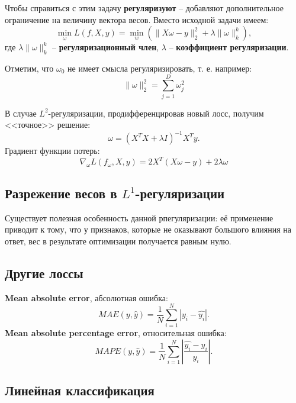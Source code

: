 \documentclass[a4paper, 10pt, openany]{book} %
\begin{document}
	Чтобы справиться с этим задачу \textbf{регуляризуют} -- добавляют дополнительное ограничение на величину вектора весов. Вместо исходной задачи имеем:
	\begin{equation*}
		\min_\omega L(f,X,y) = \min_w (\|X\omega-y\|^2_2 + \lambda \|\omega\|^k_k),
	\end{equation*}
	где $\lambda \|\omega\|^k_k$ -- \textbf{регуляризационный член}, $\lambda$ -- \textbf{коэффициент регуляризации}.
	
	Отметим, что $\omega_0$ не имеет смысла регуляризировать, т. е. например:
	\begin{equation*}
		\|\omega\|^2_2 = \sum_{j=1}^{D} \omega_j^2
	\end{equation*}
	
	В случае $L^2$-регуляризации, продифференцировав новый лосс, получим <<точное>> решение:
	\begin{equation*}
		\omega = (X^TX + \lambda I)^{-1}X^Ty.
	\end{equation*}
	Градиент функции потерь:
	\begin{equation*}
		\nabla_\omega L(f_\omega, X, y) = 2X^T(X\omega - y) + 2\lambda\omega
	\end{equation*}
	
	\subsection{Разрежение весов в $L^1$-регуляризации}
	
	Существует полезная особенность данной рпегуляризации: её применение приводит к тому, что у признаков, которые не оказывают большого влияния на ответ, вес в результате оптимизации получается равным нулю.
	
	\subsection{Другие лоссы}
	
	\textbf{Mean absolute error}, абсолютная ошибка:
	\begin{equation*}
		MAE(y,\widehat{y}) = \frac{1}{N} \sum_{i=1}^{N}|y_i - \widehat{y_i}|.
	\end{equation*} 
	\textbf{Mean absolute percentage error}, относительная ошибка:
	\begin{equation*}
		MAPE(y,\widehat{y}) = \frac{1}{N} \sum_{i=1}^{N}\left|\frac{\widehat{y_i} - y_i}{y_i}\right|.
	\end{equation*}
	
	\subsection{Линейная классификация}
	
\end{document}
